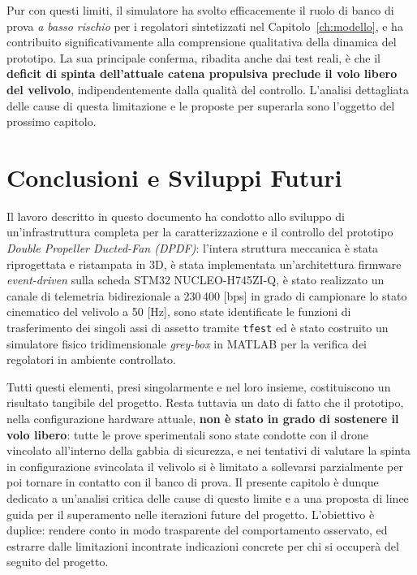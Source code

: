 \documentclass[11pt]{report}
\begin{document}
	Pur con questi limiti, il simulatore ha svolto efficacemente il ruolo di banco di prova \textit{a basso rischio} per i regolatori sintetizzati nel Capitolo~\ref{ch:modello}, e ha contribuito significativamente alla comprensione qualitativa della dinamica del prototipo. La sua principale conferma, ribadita anche dai test reali, è che il \textbf{deficit di spinta dell'attuale catena propulsiva preclude il volo libero del velivolo}, indipendentemente dalla qualità del controllo. L'analisi dettagliata delle cause di questa limitazione e le proposte per superarla sono l'oggetto del prossimo capitolo.
	
	\chapter{Conclusioni e Sviluppi Futuri}
	\label{ch:conclusioni}
	
	Il lavoro descritto in questo documento ha condotto allo sviluppo di un'infrastruttura completa per la caratterizzazione e il controllo del prototipo \textit{Double Propeller Ducted-Fan (DPDF)}: l'intera struttura meccanica è stata riprogettata e ristampata in 3D, è stata implementata un'architettura firmware \textit{event-driven} sulla scheda STM32 NUCLEO-H745ZI-Q, è stato realizzato un canale di telemetria bidirezionale a 230\,400 [bps] in grado di campionare lo stato cinematico del velivolo a 50 [Hz], sono state identificate le funzioni di trasferimento dei singoli assi di assetto tramite \texttt{tfest} ed è stato costruito un simulatore fisico tridimensionale \textit{grey-box} in MATLAB per la verifica dei regolatori in ambiente controllato.
	
	Tutti questi elementi, presi singolarmente e nel loro insieme, costituiscono un risultato tangibile del progetto. Resta tuttavia un dato di fatto che il prototipo, nella configurazione hardware attuale, \textbf{non è stato in grado di sostenere il volo libero}: tutte le prove sperimentali sono state condotte con il drone vincolato all'interno della gabbia di sicurezza, e nei tentativi di valutare la spinta in configurazione svincolata il velivolo si è limitato a sollevarsi parzialmente per poi tornare in contatto con il banco di prova. Il presente capitolo è dunque dedicato a un'analisi critica delle cause di questo limite e a una proposta di linee guida per il superamento nelle iterazioni future del progetto. L'obiettivo è duplice: rendere conto in modo trasparente del comportamento osservato, ed estrarre dalle limitazioni incontrate indicazioni concrete per chi si occuperà del seguito del progetto.
	
\end{document}
